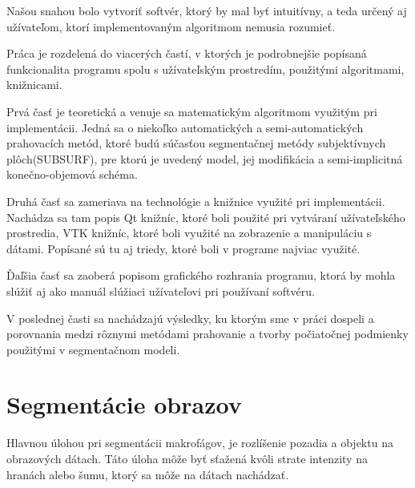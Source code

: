 \documentclass[a4paper,11pt,oneside]{article}%
\begin{document}
Našou snahou bolo vytvoriť softvér, ktorý by mal byť intuitívny, a teda určený aj užívateľom, ktorí implementovaným algoritmom nemusia rozumieť. 
  
Práca je rozdelená do viacerých častí, v ktorých je podrobnejšie popísaná funkcionalita programu spolu s užívateľským prostredím, použitými algoritmami, knižnicami.


Prvá časť je teoretická a venuje sa matematickým algoritmom využitým pri implementácii. Jedná sa o niekoľko automatických a semi-automatických prahovacích metód, ktoré budú súčasťou segmentačnej metódy subjektívnych plôch(SUBSURF), pre ktorú je uvedený model, jej modifikácia a semi-implicitná konečno-objemová schéma. 

Druhá časť sa zameriava na technológie a knižnice využité pri implementácii. Nachádza sa tam popis Qt knižníc, ktoré boli použité pri vytváraní užívateľského prostredia, VTK knižníc, ktoré boli využité na zobrazenie a manipuláciu s dátami. Popísané sú tu aj triedy, ktoré boli v programe najviac využité.

Ďaľšia časť sa zaoberá popisom grafického rozhrania programu, ktorá by mohla slúžiť aj ako manuál slúžiaci užívateľovi pri používaní softvéru.

V poslednej časti sa nachádzajú výsledky, ku ktorým sme v práci dospeli a porovnania medzi rôznymi metódami prahovanie a tvorby počiatočnej podmienky použitými v segmentačnom modeli.


  
 

\newpage

\section{Segmentácie obrazov} \label{math}

%

Hlavnou úlohou pri segmentácii makrofágov, je rozlíšenie pozadia a objektu na obrazových dátach. Táto úloha môže byť sťažená kvôli strate intenzity na hranách alebo šumu, ktorý sa môže na dátach nachádzať.
\end{document}
